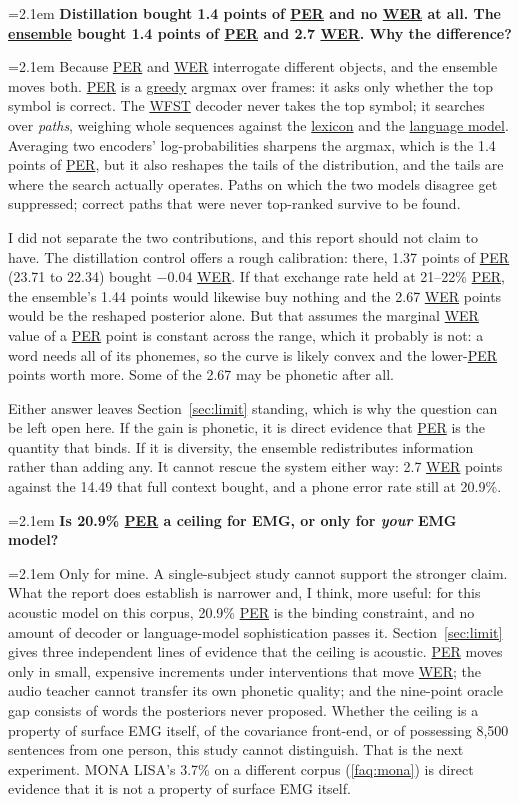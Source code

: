 \documentclass{article}
\DeclareRobustCommand{\glref}[2]{\hyperlink{gl:#1}{\textcolor{glosslink}{#2}}}
\newcounter{faqnum}
\renewcommand{\thefaqnum}{Q\arabic{faqnum}}
\newcommand{\faqq}[1]{%
  \par\addvspace{10pt}\needspace{6\baselineskip}%
  \refstepcounter{faqnum}%
  \noindent\hangindent=2.1em\hangafter=1
  \makebox[2.1em][l]{\color{tagcolor}\bfseries\small\thefaqnum}%
  \textbf{#1}\par\vspace{2pt}%
}
\newenvironment{faqa}
  {\par\begingroup\leftskip=2.1em\noindent\ignorespaces}
  {\par\endgroup\addvspace{1pt}}
\DeclareRobustCommand{\wer}{\glref{wer}{WER}}
\DeclareRobustCommand{\per}{\glref{per}{PER}}
\begin{document}
\faqq{Distillation bought 1.4 points of \per{} and no \wer{} at all. The \glref{ensemble}{ensemble} bought
1.4 points of \per{} and 2.7 \wer{}. Why the difference?}
\label{faq:ensemble}
\begin{faqa}
Because \per{} and \wer{} interrogate different objects, and the ensemble moves both. \per{} is a
\glref{greedy}{greedy} argmax over frames: it asks only whether the top symbol is correct. The
\glref{wfst}{WFST} decoder never takes the top symbol; it searches over \emph{paths}, weighing whole
sequences against the \glref{lexicon}{lexicon} and the \glref{lm}{language model}. Averaging two encoders'
log-probabilities sharpens the argmax, which is the 1.4 points of \per{}, but it also reshapes the tails of
the distribution, and the tails are where the search actually operates. Paths on which the two models
disagree get suppressed; correct paths that were never top-ranked survive to be found.

I did not separate the two contributions, and this report should not claim to have. The distillation control
offers a rough calibration: there, 1.37 points of \per{} (23.71 to 22.34) bought $-0.04$ \wer{}. If that
exchange rate held at 21--22\% \per{}, the ensemble's 1.44 points would likewise buy nothing and the 2.67
\wer{} points would be the reshaped posterior alone. But that assumes the marginal \wer{} value of a \per{}
point is constant across the range, which it probably is not: a word needs all of its phonemes, so the curve
is likely convex and the lower-\per{} points worth more. Some of the 2.67 may be phonetic after all.

Either answer leaves Section~\ref{sec:limit} standing, which is why the question can be left open here. If the
gain is phonetic, it is direct evidence that \per{} is the quantity that binds. If it is diversity, the
ensemble redistributes information rather than adding any. It cannot rescue the system either way: 2.7 \wer{}
points against the 14.49 that full context bought, and a phone error rate still at 20.9\%.
\end{faqa}

\faqq{Is 20.9\% \per{} a ceiling for EMG, or only for \emph{your} EMG model?}
\begin{faqa}
Only for mine. A single-subject study cannot support the stronger claim. What the report does establish is
narrower and, I think, more useful: for this acoustic model on this corpus, 20.9\% \per{} is the binding
constraint, and no amount of decoder or language-model sophistication passes it. Section~\ref{sec:limit} gives
three independent lines of evidence that the ceiling is acoustic. \per{} moves only in small, expensive
increments under interventions that move \wer{}; the audio teacher cannot transfer its own phonetic quality;
and the nine-point oracle gap consists of words the posteriors never proposed. Whether the ceiling is a
property of surface EMG itself, of the covariance front-end, or of possessing 8{,}500 sentences from one
person, this study cannot distinguish. That is the next experiment. MONA LISA's 3.7\% on a different corpus
(\ref{faq:mona}) is direct evidence that it is not a property of surface EMG itself.
\end{faqa}
\end{document}
